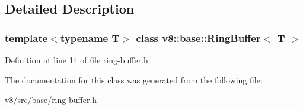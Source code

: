 \subsection{Detailed Description}
\subsubsection*{template$<$typename T$>$\newline
class v8\+::base\+::\+Ring\+Buffer$<$ T $>$}



Definition at line 14 of file ring-\/buffer.\+h.



The documentation for this class was generated from the following file\+:\begin{DoxyCompactItemize}
\item 
v8/src/base/ring-\/buffer.\+h\end{DoxyCompactItemize}
